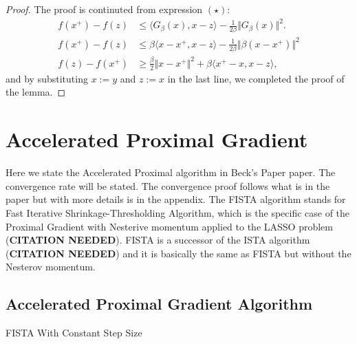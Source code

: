\documentclass[]{article}
\theoremstyle{definition}
\begin{document}
        \begin{proof}
            The proof is continuted from expression $(\star)$: 
            \begin{align*}
                f(x^+) - f(z) 
                &\le 
                \langle G_\beta(x), x - z\rangle - \frac{1}{2\beta}\Vert G_\beta(x)\Vert^2. 
                \\
                f(x^+) - f(z) & \le 
                \beta\langle x - x^+, x - z\rangle - \frac{1}{2\beta}\Vert \beta (x - x^+)\Vert^2
                \\
                f(z) - f(x^+) & \ge
                \frac{\beta}{2}\Vert x - x^+\Vert^2
                 + 
                \beta\langle x^+ - x, x - z\rangle, 
            \end{align*}
            and by substituting $x :=y$ and $z := x$ in the last line, we completed the proof of the lemma. 
        \end{proof}

\section{Accelerated Proximal Gradient}\label{sec:apg_intro}
    Here we state the Accelerated Proximal algorithm in Beck's Paper paper\cite{paper:FISTA}. The convergence rate will be stated. The convergence proof follows what is in the paper but with more details is in the appendix. The FISTA algorithm stands for Fast Iterative Shrinkage-Thresholding Algorithm, which is the specific case of the Proximal Gradient with Nesterive momentum applied to the LASSO problem (\textbf{CITATION NEEDED}). FISTA is a successor of the ISTA algorithm (\textbf{CITATION NEEDED}) and it is basically the same as FISTA but without the Nesterov momentum. 
    
    \subsection{Accelerated Proximal Gradient Algorithm} 
        \begin{algorithm}[H]\label{alg:fista_1} 
        \begin{algorithmic}[1]
                \ENDIF
            \ENDFOR
        \end{algorithmic}\caption{FISTA With Constant Step Size}
        \end{algorithm}
\end{document}
